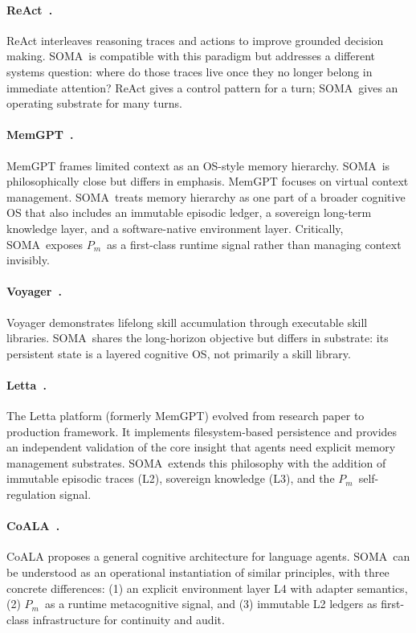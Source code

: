 \documentclass[11pt,a4paper]{article}
\newcommand{\soma}{\textsc{SOMA}}
\newcommand{\Pm}{\ensuremath{P_m}}
\begin{document}
\paragraph{ReAct~\cite{yao2023react}.}
ReAct interleaves reasoning traces and actions to improve grounded
decision making.
\soma\ is compatible with this paradigm but addresses a different
systems question: where do those traces live once they no longer belong
in immediate attention?
ReAct gives a control pattern for a turn; \soma\ gives an operating
substrate for many turns.

\paragraph{MemGPT~\cite{packer2023memgpt}.}
MemGPT frames limited context as an OS-style memory hierarchy.
\soma\ is philosophically close but differs in emphasis.
MemGPT focuses on virtual context management.
\soma\ treats memory hierarchy as one part of a broader cognitive OS
that also includes an immutable episodic ledger, a sovereign long-term
knowledge layer, and a software-native environment layer.
Critically, \soma\ exposes \Pm\ as a first-class runtime signal rather
than managing context invisibly.

\paragraph{Voyager~\cite{wang2023voyager}.}
Voyager demonstrates lifelong skill accumulation through executable
skill libraries.
\soma\ shares the long-horizon objective but differs in substrate:
its persistent state is a layered cognitive OS, not primarily a skill
library.

\paragraph{Letta~\cite{packer2024letta}.}
The Letta platform (formerly MemGPT) evolved from research paper to
production framework. It implements filesystem-based persistence and
provides an independent validation of the core insight that agents need
explicit memory management substrates. \soma\ extends this philosophy
with the addition of immutable episodic traces (L2), sovereign knowledge
(L3), and the \Pm\ self-regulation signal.

\paragraph{CoALA~\cite{sumers2023coala}.}
CoALA proposes a general cognitive architecture for language agents.
\soma\ can be understood as an operational instantiation of similar
principles, with three concrete differences: (1) an explicit environment
layer L4 with adapter semantics, (2) \Pm\ as a runtime metacognitive
signal, and (3) immutable L2 ledgers as first-class infrastructure
for continuity and audit.
\end{document}
